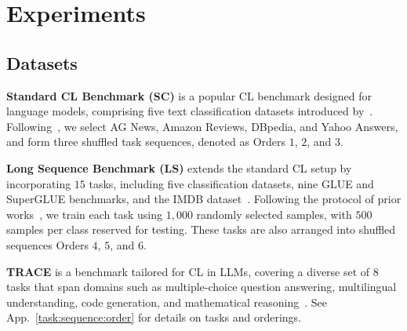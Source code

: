 \documentclass[11pt]{article}
\begin{document}


\section{Experiments}
\subsection{Datasets} 
\textbf{Standard CL Benchmark (SC)} is a popular CL benchmark designed for language models, comprising five text classification datasets introduced by~\cite{zhang2015character}. Following~\cite{wang2023orthogonal}, we select AG News, Amazon Reviews, DBpedia, and Yahoo Answers, and form three shuffled task sequences, denoted as Orders $1$, $2$, and $3$. 

\textbf{Long Sequence Benchmark (LS)} extends the standard CL setup by incorporating $15$ tasks, including five classification datasets, nine GLUE and SuperGLUE benchmarks, and the IMDB dataset~\cite{razdaibiedina2023progressive}. Following the protocol of prior works~\cite{liao2025data}, we train each task using $1,000$ randomly selected samples, with $500$ samples per class reserved for testing. These tasks are also arranged into shuffled sequences Orders $4$, $5$, and $6$. 

\textbf{TRACE} is a benchmark tailored for CL in LLMs, covering a diverse set of $8$ tasks that span domains such as multiple-choice question answering, multilingual understanding, code generation, and mathematical reasoning~\cite{wang2023trace}. 
See App.~\ref{task:sequence:order} for details on tasks and orderings.
\end{document}
